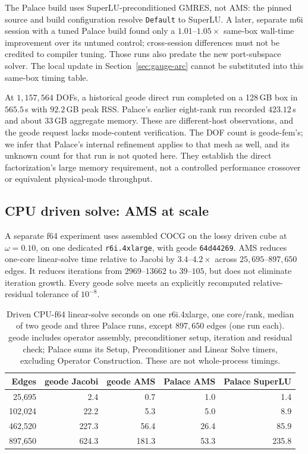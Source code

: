 \documentclass{anvil-paper}
\begin{document}
The Palace build uses SuperLU-preconditioned GMRES, not AMS:
the pinned source and build configuration resolve \texttt{Default} to
SuperLU. A later, separate m6i session with a tuned Palace build found
only a $1.01$--$1.05\times$ same-box wall-time improvement over its
untuned control; cross-session differences must not be credited to
compiler tuning. Those runs also predate the new port-subspace solver.
The local update in Section~\ref{sec:gauge-arc} cannot be substituted
into this same-box timing table.

At $1{,}157{,}564$ DOFs, a historical geode direct run completed on a
128\,GB box in $565.5$\,s with $92.2$\,GB peak RSS. Palace's earlier
eight-rank run recorded $423.12$\,s and about $33$\,GB aggregate memory.
These are different-host observations, and the geode request lacks
mode-content verification. The DOF count is geode-fem's; we infer that
Palace's internal refinement applies to that mesh as well, and its
unknown count for that run is not quoted here. They establish the direct factorization's
large memory requirement, not a controlled performance crossover or
equivalent physical-mode throughput.

\subsection{CPU driven solve: AMS at scale}
\label{sec:perf-ams}

A separate f64 experiment uses assembled COCG on the lossy driven cube
at $\omega=0.10$, on one dedicated \texttt{r6i.4xlarge}, with geode
\texttt{64d44269}. AMS reduces one-core linear-solve time relative to
Jacobi by $3.4$--$4.2\times$ across $25{,}695$--$897{,}650$ edges.
It reduces iterations from $2969$--$13662$ to $39$--$105$, but does
not eliminate iteration growth. Every geode solve meets an explicitly
recomputed relative-residual tolerance of $10^{-8}$.

\begin{table}[t]
  \centering
  \caption{Driven CPU-f64 linear-solve seconds on one r6i.4xlarge,
  one core/rank, median of two geode and three Palace runs, except
  $897{,}650$ edges (one run each). geode includes operator assembly,
  preconditioner setup, iteration and residual check; Palace sums its
  Setup, Preconditioner and Linear Solve timers, excluding Operator
  Construction. These are not whole-process timings.}
  \label{tab:ams}
  \small
  \begin{tabular}{@{}rrrrr@{}}
    \toprule
    Edges & geode Jacobi & geode AMS & Palace AMS & Palace SuperLU \\
    \midrule
    25,695 & 2.4 & 0.7 & 1.0 & 1.4 \\
    102,024 & 22.2 & 5.3 & 5.0 & 8.9 \\
    462,520 & 227.3 & 56.4 & 26.4 & 85.9 \\
    897,650 & 624.3 & 181.3 & 53.3 & 235.8 \\
    \bottomrule
  \end{tabular}
\end{table}
\end{document}
